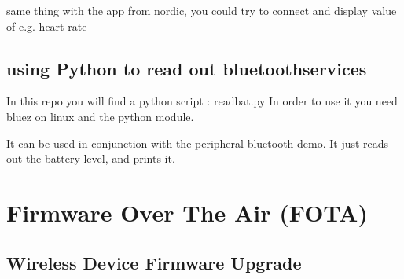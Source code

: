\documentclass[letterpaper,10pt,english]{sphinxmanual}
\begin{document}
same thing with the app from nordic, you could try to connect and display value of e.g. heart rate


\section{using Python to read out bluetoothservices}
\label{\detokenize{bluetooth:using-python-to-read-out-bluetoothservices}}
In this repo you will find a python script : readbat.py
In order to use it you need bluez on linux and the python  module.

It can be used in conjunction with the peripheral bluetooth demo.
It just reads out the battery level, and prints it.

\begin{sphinxVerbatim}[commandchars=\\\{\}]
 
    

  

   

     \PYG{p}{[}\PYG{p}{]}
    
\end{sphinxVerbatim}


\chapter{Firmware Over The Air (FOTA)}
\label{\detokenize{fota/fota:firmware-over-the-air-fota}}\label{\detokenize{fota/fota:fota}}\label{\detokenize{fota/fota::doc}}

\section{Wireless Device Firmware Upgrade}
\label{\detokenize{fota/mcuboot:wireless-device-firmware-upgrade}}\label{\detokenize{fota/mcuboot:mcuboot}}\label{\detokenize{fota/mcuboot::doc}}
\end{document}
